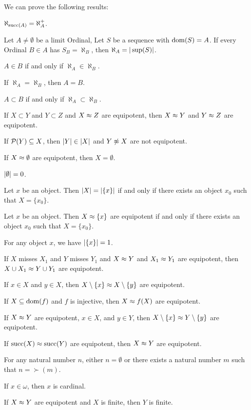 \documentclass{article}
\begin{document}
We can prove the following results:
\begin{thm}
\item\label{card1:19} $\aleph_{\operatorname{succ}(A)}=\aleph_{A}^{+}$.
\item\label{card1:20} Let $A\neq\emptyset$ be a limit Ordinal,
  Let $S$ be a sequence with $\operatorname{dom}(S)=A$.
  If every Ordinal $B\in A$ has $S_{B}=\aleph_{B}$,
  then $\aleph_{A}=|\sup(S)|$.
\item\label{card1:21} $A\in B$ if and only if $\aleph_{A}\in\aleph_{B}$.
\item\label{card1:22} If $\aleph_{A}=\aleph_{B}$, then $A=B$.
\item\label{card1:23} $A\subset B$ if and only if
  $\aleph_{A}\subset\aleph_{B}$.
\item\label{card1:24} If $X\subset Y$ and $Y\subset Z$ and $X\approx Z$
  are equipotent, then $X\approx Y$ and $Y\approx Z$ are equipotent.
\item\label{card1:25} If $\mathcal{P}(Y)\subseteq X$,
  then $|Y|\in|X|$ and $Y\not\approx X$ are not equipotent.
\item\label{card1:26} If $X\approx\emptyset$ are equipotent, then
  $X=\emptyset$. 
\item\label{card1:27} $|\emptyset|=0$.
\item\label{card1:28} Let $x$ be an object. Then $|X|=|\{x\}|$
  if and only if there exists an object $x_{0}$ such that $X=\{x_{0}\}$.
\item\label{card1:29} Let $x$ be an object.
  Then $X\approx\{x\}$ are equipotent
  if and only if there exists an object $x_{0}$ such that $X=\{x_{0}\}$.
\item\label{card1:30} For any object $x$, we have $|\{x\}|=1$.
\item\label{card1:31} If $X$ misses $X_{1}$ and $Y$ misses $Y_{1}$ and
  $X\approx Y$ and $X_{1}\approx Y_{1}$ are equipotent,
  then $X\cup X_{1}\approx Y\cup Y_{1}$ are equipotent.
\item\label{card1:32} If $x\in X$ and $y\in X$,
  then $X\setminus\{x\}\approx X\setminus\{y\}$ are equipotent.
\item\label{card1:33} If $X\subseteq\operatorname{dom}(f)$ and $f$ is injective,
  then $X\approx f(X)$ are equipotent.
\item\label{card1:34} If $X\approx Y$ are equipotent, $x\in X$, and
  $y\in Y$, then $X\setminus\{x\}\approx Y\setminus\{y\}$ are equipotent.
\item\label{card1:35} If $\operatorname{succ}(X)\approx\operatorname{succ}(Y)$ are equipotent,
  then $X\approx Y$ are equipotent.
\item\label{card1:36} For any natural number $n$,
  either $n=\emptyset$ or there exists a natural number $m$ such that
  $n=\succ(m)$. 
\item\label{card1:37} If $x\in\omega$, then $x$ is cardinal.
\item\label{card1:38} If $X\approx Y$ are equipotent and $X$ is
  finite,
  then $Y$ is finite.
\end{thm}
\end{document}
